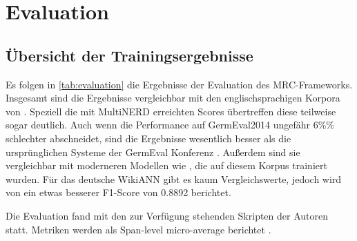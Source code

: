 
\chapter{Evaluation}
\label{ch:Evaluation}

\section{Übersicht der Trainingsergebnisse}
\label{ch:Evaluation:sec:Übersicht_der_Trainingsergebnisse}

Es folgen in \autoref{tab:evaluation} die Ergebnisse der Evaluation des MRC-Frameworks. Insgesamt sind die Ergebnisse vergleichbar mit den englischsprachigen Korpora von \cite[6]{li2019unified}. Speziell die mit MultiNERD erreichten Scores übertreffen diese teilweise sogar deutlich. Auch wenn die Performance auf GermEval2014 ungefähr 6\%\% schlechter abschneidet, sind die Ergebnisse wesentlich besser als die ursprünglichen Systeme der GermEval Konferenz \parencite[6]{germeval2014}. Außerdem sind sie vergleichbar mit moderneren Modellen wie \cite[3,4]{riedl-pado-shootout}, die auf diesem Korpus trainiert wurden. Für das deutsche WikiANN gibt es kaum Vergleichswerte, jedoch wird von \cite{Schiesser_2023} ein etwas besserer F1-Score von 0.8892 berichtet.

Die Evaluation fand mit den zur Verfügung stehenden Skripten der Autoren statt. Metriken werden als Span-level micro-average berichtet \parencite[5,6]{li2019unified}.

